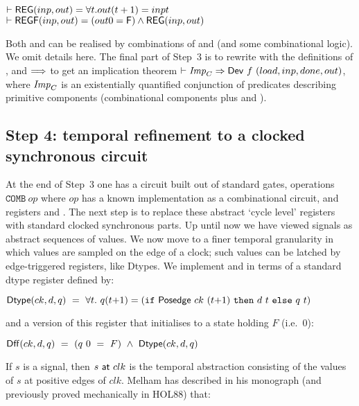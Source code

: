 {\baselineskip16pt\begin{alltt}
\( \vdash \DEF{REG}(inp,out) = {\forall}t. out(t+1) = inp t          \)
\( \vdash \DEF{REGF}(inp,out) = (out 0 = \DEF{F}) \wedge \DEF{REG}(inp,out)\)
\end{alltt}}

Both  and  can be realised by combinations of
 and  (and some combinational logic). We omit
details here. The final part of Step~3 is to rewrite with the
definitions of ,  and $\Longrightarrow$ to get an implication
theorem $\vdash {\it{Imp}}_C \Rightarrow \mathsf{Dev}~f~(load,inp,done,out)$, where ${\it{Imp}}_C$
is an existentially quantified conjunction of predicates describing
primitive components (combinational components plus  and
).

\subsection*{Step 4: temporal refinement to a clocked synchronous circuit}

At the end of Step~3 one has a circuit built out of standard gates,
operations $\texttt{COMB}~op$ where $op$ has a known implementation as
a combinational circuit, and registers  and .  The
next step is to replace these abstract `cycle level' registers with
standard clocked synchronous parts. Up until now we have viewed
signals as abstract sequences of values.  We now move to a finer
temporal granularity in which values are sampled on the edge of a
clock; such values can be latched by edge-triggered registers, like
Dtypes. We implement  and  in terms of a standard
dtype register defined by:

\vspace*{2mm}

$\mathsf{Dtype}(ck,d,q) ~=~ \forall t.~q(t{+}1) = (\texttt{if}~\mathsf{Posedge}~ck~(t{+}1)~\texttt{then}~d~t~\texttt{else}~q~t)$

\vspace*{2mm}

\noindent and a version of this register that initialises to a state holding $F$ (i.e.~$0$):

\vspace*{2mm}

$\mathsf{Dff}(ck,d,q) ~ = ~ (q~0~ =~F)~\wedge~\mathsf{Dtype}(ck,d,q)$

\vspace*{2mm}

If $s$ is a signal, then $s~\mathsf{at}~clk$ is the temporal
abstraction consisting of the values of $s$ at positive edges of
$clk$. 
Melham has described in his monograph (and previously proved mechanically in HOL88) that:




